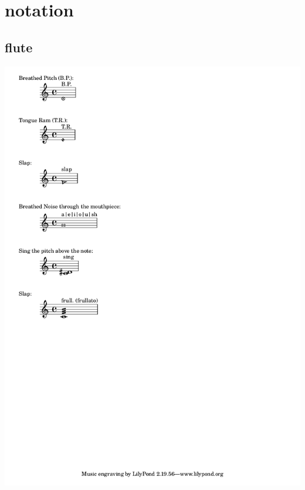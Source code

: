 \documentclass[12pt]{book}
\begin{document}
\section{notation}
\begin{multicols}{3}
\subsection{flute}
\includegraphics[scale=0.7, clip, trim=0 2cm 10cm 0 ]{../../../../reference/flute-notation.png}

\end{multicols}
\end{document}
